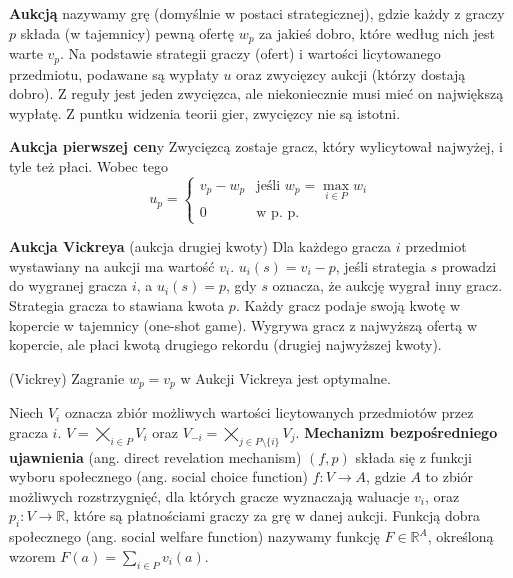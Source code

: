 \begin{definicja}
    \textbf{Aukcją} nazywamy grę (domyślnie w postaci strategicznej), gdzie każdy z graczy $p$ składa (w tajemnicy)
    pewną ofertę $w_p$ za jakieś dobro, które według nich jest warte $v_p$. Na podstawie strategii graczy (ofert)
    i wartości licytowanego przedmiotu, podawane są wypłaty $u$ oraz zwycięzcy aukcji (którzy dostają dobro).
    Z reguły jest jeden zwycięzca, ale niekoniecznie musi mieć on największą wypłatę. Z puntku widzenia teorii gier, zwycięzcy nie są istotni.
\end{definicja}

\begin{definicja}{\textbf{Aukcja pierwszej cen}y}
    Zwycięzcą zostaje gracz, który wylicytował najwyżej, i tyle też płaci. Wobec tego
    \[u_p = \begin{cases} 
                v_p - w_p & \text{jeśli } w_p = \max\limits_{i \in P}w_i \\
                0 & \text{w p. p.}
            \end{cases}
    \]
\end{definicja}

\begin{definicja}{\textbf{Aukcja Vickreya} (aukcja drugiej kwoty)}
    Dla każdego gracza $i$ przedmiot wystawiany na aukcji ma wartość $v_i$.
    $u_i(s) = v_i - p$, jeśli strategia $s$ prowadzi do wygranej gracza $i$, a $u_i(s) = p$, gdy $s$ oznacza,
    że aukcję wygrał inny gracz. Strategia gracza to stawiana kwota $p$. Każdy gracz podaje swoją kwotę w kopercie
    w tajemnicy (one-shot game). Wygrywa gracz z najwyższą ofertą w kopercie, ale płaci kwotą drugiego rekordu (drugiej najwyższej kwoty).
\end{definicja}

\begin{twierdzenie}{(Vickrey)}
    Zagranie $w_p = v_p$ w Aukcji Vickreya jest optymalne.
\end{twierdzenie}

\begin{definicja}
    Niech $V_i$ oznacza zbiór możliwych wartości licytowanych przedmiotów przez gracza $i$.
    $V = \bigtimes\limits_{i \in P} V_i$ oraz $V_{-i} = \bigtimes\limits_{j \in P \setminus \{i\}} V_j$.
    \textbf{Mechanizm bezpośredniego ujawnienia} (ang. direct revelation mechanism) $(f, p)$ składa się z funkcji wyboru społecznego
    (ang. social choice function) $f : V \rightarrow A$, gdzie $A$ to zbiór możliwych rozstrzygnięć, dla których gracze
    wyznaczają waluacje $v_i$, oraz $p_i : V \rightarrow \mathbb{R}$, które są płatnościami graczy za grę w danej aukcji.
    Funkcją dobra społecznego (ang. social welfare function) nazywamy funkcję $F \in \mathbb{R}^A$, określoną wzorem $F(a) = \sum\limits_{i \in P} v_i(a)$.
\end{definicja}

